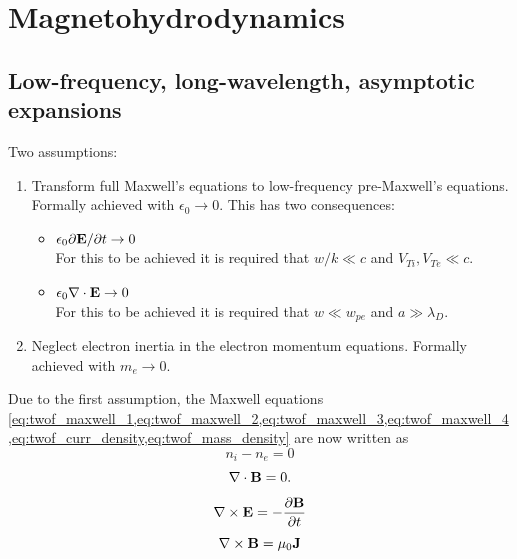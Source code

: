 \documentclass[a4paper,11pt]{report}
\begin{document}
\chapter{Magnetohydrodynamics}

\section{Low-frequency, long-wavelength, asymptotic expansions}
Two assumptions:
\begin{enumerate}
\item Transform full Maxwell's equations to low-frequency pre-Maxwell's equations. Formally achieved with $\epsilon_0 \to 0$. This has two consequences:
\begin{itemize}
\item $\epsilon_0 \partial \mathbf{E} / \partial t \to 0$ \\
For this to be achieved it is required that $w/k \ll c$ and $V_{Ti}, V_{Te} \ll c$.
\item $\epsilon_0 \nabla \cdot \mathbf{E} \to 0$\\
For this to be achieved it is required that $w \ll w_{pe}$ and $a \gg \lambda_{D}$.
\end{itemize}
\item Neglect electron inertia in the electron momentum equations. Formally achieved with $m_e \to 0$.
\end{enumerate}

Due to the first assumption, the Maxwell equations \cref{eq:twof_maxwell_1,eq:twof_maxwell_2,eq:twof_maxwell_3,eq:twof_maxwell_4,eq:twof_curr_density,eq:twof_mass_density} are now written as
\begin{equation}
\label{eq:preMax_gauss}
n_i - n_e = 0
\end{equation}
\begin{equation}
\label{eq:preMax_Bdiv}
\nabla \cdot \mathbf{B} = 0.
\end{equation}
\begin{equation}
\label{eq:preMax_faradays}
\nabla \times \mathbf{E} = -\frac{ \partial \mathbf{B}}{\partial t}
\end{equation}
\begin{equation}
\label{eq:preMax_amperes}
\nabla \times \mathbf{B} = \mu_0 \mathbf{J} 
\end{equation}
\end{document}
